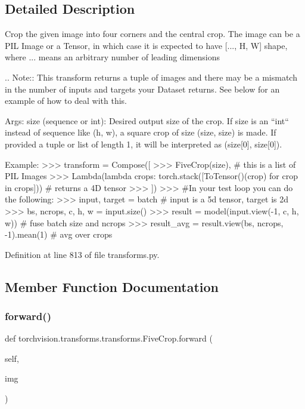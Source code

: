 \subsection{Detailed Description}
\begin{DoxyVerb}Crop the given image into four corners and the central crop.
The image can be a PIL Image or a Tensor, in which case it is expected
to have [..., H, W] shape, where ... means an arbitrary number of leading
dimensions

.. Note::
     This transform returns a tuple of images and there may be a mismatch in the number of
     inputs and targets your Dataset returns. See below for an example of how to deal with
     this.

Args:
     size (sequence or int): Desired output size of the crop. If size is an ``int``
        instead of sequence like (h, w), a square crop of size (size, size) is made.
        If provided a tuple or list of length 1, it will be interpreted as (size[0], size[0]).

Example:
     >>> transform = Compose([
     >>>    FiveCrop(size), # this is a list of PIL Images
     >>>    Lambda(lambda crops: torch.stack([ToTensor()(crop) for crop in crops])) # returns a 4D tensor
     >>> ])
     >>> #In your test loop you can do the following:
     >>> input, target = batch # input is a 5d tensor, target is 2d
     >>> bs, ncrops, c, h, w = input.size()
     >>> result = model(input.view(-1, c, h, w)) # fuse batch size and ncrops
     >>> result_avg = result.view(bs, ncrops, -1).mean(1) # avg over crops
\end{DoxyVerb}
 

Definition at line 813 of file transforms.\+py.



\subsection{Member Function Documentation}
\mbox{\label{classtorchvision_1_1transforms_1_1transforms_1_1FiveCrop_a491671efa0135d22dd0b5b155787936c}} 
\subsubsection{\texorpdfstring{forward()}{forward()}}
{\footnotesize\ttfamily def torchvision.\+transforms.\+transforms.\+Five\+Crop.\+forward (\begin{DoxyParamCaption}\item[{}]{self,  }\item[{}]{img }\end{DoxyParamCaption})}

